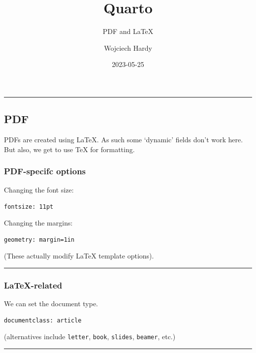 \documentclass[
  11pt,
]{article}
\title{Quarto}
\subtitle{PDF and LaTeX}
\author{Wojciech Hardy}
\date{2023-05-25}
\begin{document}
\maketitle
\ifdefined\Shaded\renewenvironment{Shaded}{\begin{tcolorbox}[sharp corners, borderline west={3pt}{0pt}{shadecolor}, frame hidden, boxrule=0pt, enhanced, interior hidden, breakable]}{\end{tcolorbox}}\fi

\begin{center}\rule{0.5\linewidth}{0.5pt}\end{center}

\hypertarget{pdf}{%
\subsection{PDF}\label{pdf}}

PDFs are created using LaTeX. As such some `dynamic' fields don't work
here. But also, we get to use TeX for formatting.

\hypertarget{pdf-specifc-options}{%
\subsubsection{PDF-specifc options}\label{pdf-specifc-options}}

Changing the font size:

\texttt{fontsize:\ 11pt}

Changing the margins:

\texttt{geometry:\ margin=1in}

(These actually modify LaTeX template options).

\begin{center}\rule{0.5\linewidth}{0.5pt}\end{center}

\hypertarget{latex-related}{%
\subsubsection{LaTeX-related}\label{latex-related}}

We can set the document type.

\texttt{documentclass:\ article}

(alternatives include \texttt{letter}, \texttt{book}, \texttt{slides},
\texttt{beamer}, etc.)

\begin{center}\rule{0.5\linewidth}{0.5pt}\end{center}
\end{document}
